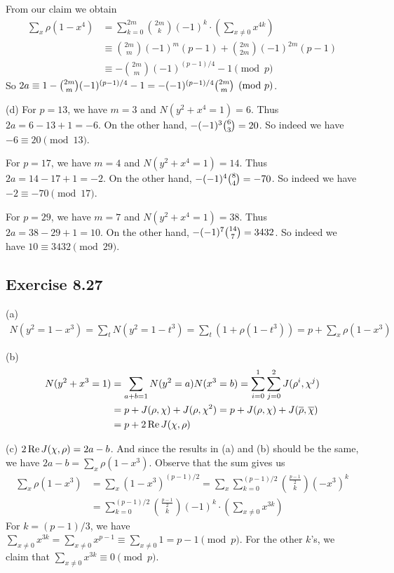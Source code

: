 \documentclass[../I&R.tex]{subfiles}
\begin{document}
From our claim we obtain
\begin{align*}
\sum_x \rho(1-x^4) &= \sum_{k=0}^{2m}\binom{2m}{k}(-1)^k\cdot\left(\sum_{x\neq0} x^{4k}\right) \\
&\equiv \binom{2m}{m}(-1)^{m}(p-1)+\binom{2m}{2m}(-1)^{2m}(p-1) \\
&\equiv -\binom{2m}{m}(-1)^{(p-1)/4} - 1 \pmod{p}
\end{align*}
So $2a\equiv 1-\tbinom{2m}{m}(-1)^{(p-1)/4}-1 = -(-1)^{(p-1)/4}\tbinom{2m}{m} \pmod{p}$.

(d) For $p=13$, we have $m=3$ and $N(y^2+x^4=1)=6$. Thus $2a=6-13+1=-6$. On the other hand, $-(-1)^3\tbinom{6}{3}=20$. So indeed we have $-6\equiv20\pmod{13}$.

For $p=17$, we have $m=4$ and $N(y^2+x^4=1)=14$. Thus $2a=14-17+1=-2$. On the other hand, $-(-1)^4\tbinom{8}{4}=-70$. So indeed we have $-2\equiv-70\pmod{17}$.

For $p=29$, we have $m=7$ and $N(y^2+x^4=1)=38$. Thus $2a=38-29+1=10$. On the other hand, $-(-1)^7\tbinom{14}{7}=3432$. So indeed we have $10\equiv3432\pmod{29}$.

\subsection*{Exercise 8.27}

(a) \begin{align*}
N(y^2=1-x^3) = \sum_t N(y^2=1-t^3) = \sum _t (1+\rho(1-t^3)) = p+\sum_x \rho(1-x^3)
\end{align*}

(b) \begin{align*}
N(y^2+x^3=1) &= \sum_{a+b=1} N(y^2=a)N(x^3=b) = \sum_{i=0}^1\sum_{j=0}^2 J(\rho^i,\chi^j) \\
&= p+J(\rho,\chi)+J(\rho,\chi^2) = p+J(\rho,\chi)+J(\overline{\rho},\overline{\chi}) \\
&= p+2\operatorname{Re} J(\chi,\rho)
\end{align*}

(c) $2\operatorname{Re} J(\chi,\rho)=2a-b$. And since the results in (a) and (b) should be the same, we have $2a-b=\sum_x \rho(1-x^3)$. Observe that the sum gives us
\begin{align*}
\sum_x \rho(1-x^3) &= \sum_x (1-x^3)^{(p-1)/2} = \sum_x \sum_{k=0}^{(p-1)/2} \binom{\frac{p-1}{2}}{k}(-x^3)^k \\
&= \sum_{k=0}^{(p-1)/2}\binom{\frac{p-1}{2}}{k}(-1)^k\cdot\left(\sum_{x\neq0} x^{3k}\right)
\end{align*}
For $k=(p-1)/3$, we have $\sum_{x\neq0} x^{3k} = \sum_{x\neq0} x^{p-1} \equiv\sum_{x\neq0} 1 = p-1 \pmod{p}$. For the other $k$'s, we claim that $\sum_{x\neq0} x^{3k}\equiv0\pmod{p}$.
\end{document}
